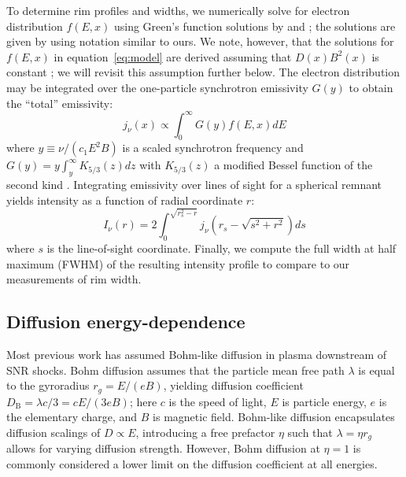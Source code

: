 \documentclass[iop, apj, numberedappendix]{emulateapj}
\newcommand*{\mt}{\mathrm}
\begin{document}
To determine rim profiles and widths, we numerically solve for electron
distribution $f(E,x)$ using Green's function solutions by \citet{lerche1980}
and \citet{rettig2012}; the solutions are given by 
using notation similar to ours.  We note, however, that the solutions for
$f(E,x)$ in equation~\eqref{eq:model} are derived assuming that $D(x) B^2(x)$
is constant \citep{lerche1980}; we will revisit this assumption further below.
The electron distribution may be integrated over the one-particle synchrotron
emissivity $G(y)$ to obtain the ``total'' emissivity:
\begin{equation} \label{eq:emissivity}
    j_{\nu}(x) \propto \int_0^\infty G(y) f(E,x) dE
\end{equation}
where $y \equiv \nu/(c_1 E^2 B)$ is a scaled synchrotron frequency and
$G(y) = y \int_y^\infty K_{5/3}(z) dz$ with $K_{5/3}(z)$ a modified Bessel
function of the second kind \citep{pacholczyk1970}.  Integrating emissivity
over lines of sight for a spherical remnant yields intensity as a function of
radial coordinate $r$:
\begin{equation} \label{eq:intensity}
    I_{\nu}(r) = 2 \int_0^{\sqrt{r_s^2 - r}}
                   j_{\nu} \left( r_s - \sqrt{s^2 + r^2} \right) ds
\end{equation}
where $s$ is the line-of-sight coordinate.  Finally, we compute the full width
at half maximum (FWHM) of the resulting intensity profile to compare to our
measurements of rim width.

\subsection{Diffusion energy-dependence} \label{sec:diffcoeff}

Most previous work has assumed Bohm-like diffusion in plasma downstream of SNR
shocks.  Bohm diffusion assumes that the particle mean free path $\lambda$ is
equal to the gyroradius $r_g = E/(eB)$, yielding diffusion coefficient
$D_{\mt{B}} = \lambda c / 3 = c E / (3 e B)$; here $c$ is the speed of light,
$E$ is particle energy, $e$ is the elementary charge, and $B$ is magnetic
field.  Bohm-like diffusion encapsulates diffusion scalings of $D \propto E$,
introducing a free prefactor $\eta$ such that $\lambda = \eta r_g$ allows for
varying diffusion strength.  However, Bohm diffusion at $\eta = 1$ is commonly
considered a lower limit on the diffusion coefficient at all energies.
\end{document}
